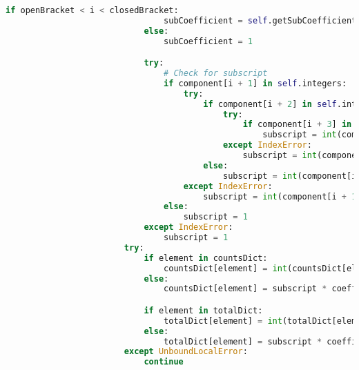 \documentclass[a4paper,12pt]{article}
\begin{document}
\begin{lstlisting}[language=Python, caption=parseComponent method for finding elements]
                            if openBracket < i < closedBracket:
                                subCoefficient = self.getSubCoefficient(component)
                            else:
                                subCoefficient = 1

                            try:
                                # Check for subscript
                                if component[i + 1] in self.integers:
                                    try:
                                        if component[i + 2] in self.integers:
                                            try:
                                                if component[i + 3] in self.integers:
                                                    subscript = int(component[i + 1: i + 4])
                                            except IndexError:
                                                subscript = int(component[i + 1: i + 3])
                                        else:
                                            subscript = int(component[i + 1])
                                    except IndexError:
                                        subscript = int(component[i + 1])
                                else:
                                    subscript = 1
                            except IndexError:
                                subscript = 1
                        try:
                            if element in countsDict:
                                countsDict[element] = int(countsDict[element]) + subscript * coefficient * subCoefficient
                            else:
                                countsDict[element] = subscript * coefficient * subCoefficient

                            if element in totalDict:
                                totalDict[element] = int(totalDict[element]) + subscript * coefficient * subCoefficient
                            else:
                                totalDict[element] = subscript * coefficient * subCoefficient
                        except UnboundLocalError:
                            continue


\end{lstlisting}
\end{document}
